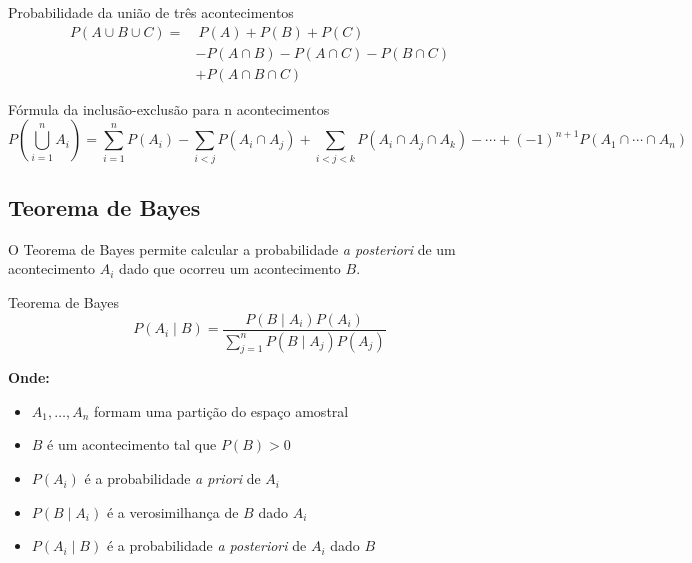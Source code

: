 \documentclass[a4paper,12pt]{article}
\begin{document}
\begin{formulabox}{Probabilidade da união de três acontecimentos}
\begin{equation}\label{formula2}\tag{Fórmula 2}
\begin{aligned}
    P(A \cup B \cup C) = &\ P(A) + P(B) + P(C) \\
    &- P(A \cap B) - P(A \cap C) - P(B \cap C) \\
    &+ P(A \cap B \cap C)
\end{aligned}
\end{equation}
\end{formulabox}

\begin{formulabox}{Fórmula da inclusão-exclusão para n acontecimentos}
\begin{equation}\label{formula3}\tag{Fórmula 3}
P\left(\bigcup_{i=1}^n A_i\right) = \sum_{i=1}^n P(A_i) - \sum_{i<j} P(A_i \cap A_j) + \sum_{i<j<k} P(A_i \cap A_j \cap A_k) - \cdots + (-1)^{n+1} P(A_1 \cap \cdots \cap A_n)
\end{equation}
\end{formulabox}

\subsection{Teorema de Bayes}

O Teorema de Bayes permite calcular a probabilidade \textit{a posteriori} de um acontecimento $A_i$ dado que ocorreu um acontecimento $B$.

\begin{formulabox}{Teorema de Bayes}
\begin{equation}\label{formula4}\tag{Fórmula 4}
    P(A_i \mid B) = \frac{P(B \mid A_i) P(A_i)}{\sum\limits_{j=1}^n P(B \mid A_j) P(A_j)}
\end{equation}

\textbf{Onde:}
\begin{itemize}
    \item $A_1, \ldots, A_n$ formam uma partição do espaço amostral
    \item $B$ é um acontecimento tal que $P(B) > 0$
    \item $P(A_i)$ é a probabilidade \textit{a priori} de $A_i$
    \item $P(B \mid A_i)$ é a verosimilhança de $B$ dado $A_i$
    \item $P(A_i \mid B)$ é a probabilidade \textit{a posteriori} de $A_i$ dado $B$
\end{itemize}
\end{formulabox}
\end{document}

